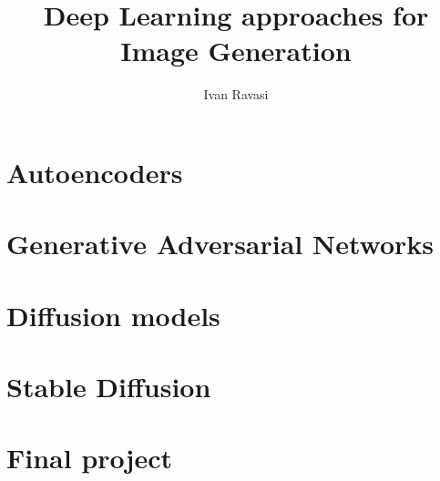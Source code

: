 \documentclass[xcolor=dvipsnames]{beamer}
\title[Image generation through DL]{Deep Learning approaches for Image Generation}
\author[I. Ravasi]{Ivan Ravasi}
\begin{document}
    \frame{\titlepage}
    
    \section{Autoencoders}
    
    \section{Generative Adversarial Networks}
    
    \section{Diffusion models}
    
    \section{Stable Diffusion}
    
    \section{Final project}
    
\end{document}
